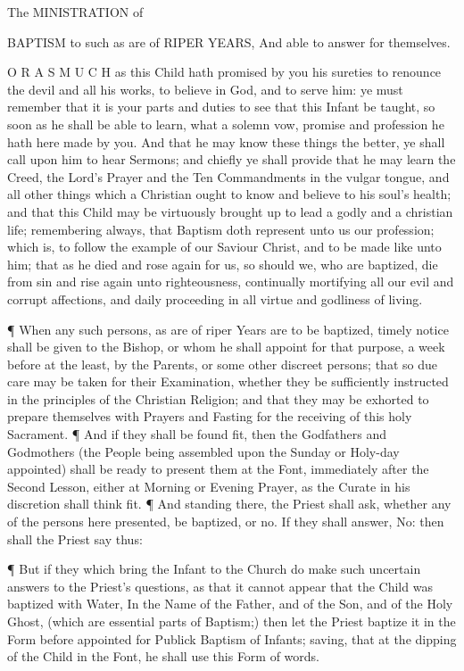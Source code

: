 The MINISTRATION of

BAPTISM to such as are of RIPER YEARS, And able to answer for themselves.

O R A S M U C H as this Child hath promised by you his sureties to renounce the devil and all his works, to believe in God, and to serve him: ye must remember that it is your parts and duties to see that this Infant be taught, so soon as he shall be able to learn, what a solemn vow, promise and profession he hath here made by you. And that he may know these things the better, ye shall call upon him to hear Sermons; and chiefly ye shall provide that he may learn the Creed, the Lord’s Prayer and the Ten Commandments in the vulgar tongue, and all other things which a Christian ought to know and believe to his soul’s health; and that this Child may be virtuously brought up to lead a godly and a christian life; remembering always, that Baptism doth represent unto us our profession; which is, to follow the example of our Saviour Christ, and to be made like unto him; that as he died and rose again for us, so should we, who are baptized, die from sin and rise again unto righteousness, continually mortifying all our evil and corrupt affections, and daily proceeding in all virtue and godliness of living.

¶ When any such persons, as are of riper Years are to be baptized, timely notice shall be given to the Bishop, or whom he shall appoint for that purpose, a week before at the least, by the Parents, or some other discreet persons; that so due care may be taken for their Examination, whether they be sufficiently instructed in the principles of the Christian Religion; and that they may be exhorted to prepare themselves with Prayers and Fasting for the receiving of this holy Sacrament. ¶ And if they shall be found fit, then the Godfathers and Godmothers (the People being assembled upon the Sunday or Holy-day appointed) shall be ready to present them at the Font, immediately after the Second Lesson, either at Morning or Evening Prayer, as the Curate in his discretion shall think fit. ¶ And standing there, the Priest shall ask, whether any of the persons here presented, be baptized, or no. If they shall answer, No: then shall the Priest say thus:

¶ But if they which bring the Infant to the Church do make such uncertain answers to the Priest’s questions, as that it cannot appear that the Child was baptized with Water, In the Name of the Father, and of the Son, and of the Holy Ghost, (which are essential parts of Baptism;) then let the Priest baptize it in the Form before appointed for Publick Baptism of Infants; saving, that at the dipping of the Child in the Font, he shall use this Form of words.

